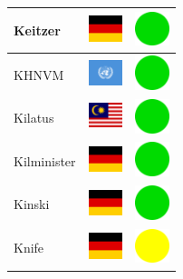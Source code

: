 \documentclass[12pt, a4paper, twoside]{report}
\begin{document}
\begin{center}
\begin{longtable}{|p{5cm}|p{2cm}|p{2cm}|}
 Keitzer                                                    & \includegraphics[width=1cm]{../4x3/de} &   \includegraphics[width=1cm]{../likes/y} \\ \hline
 KHNVM                                                      & \includegraphics[width=1cm]{../4x3/un} &   \includegraphics[width=1cm]{../likes/y} \\ \hline
 Kilatus                                                    & \includegraphics[width=1cm]{../4x3/my} &   \includegraphics[width=1cm]{../likes/y} \\ \hline
 Kilminister                                                & \includegraphics[width=1cm]{../4x3/de} &   \includegraphics[width=1cm]{../likes/y} \\ \hline
 Kinski                                                     & \includegraphics[width=1cm]{../4x3/de} &   \includegraphics[width=1cm]{../likes/y} \\ \hline
 Knife                                                      & \includegraphics[width=1cm]{../4x3/de} &   \includegraphics[width=1cm]{../likes/m} \\ \hline

\end{longtable}
\end{center}
\end{document}
